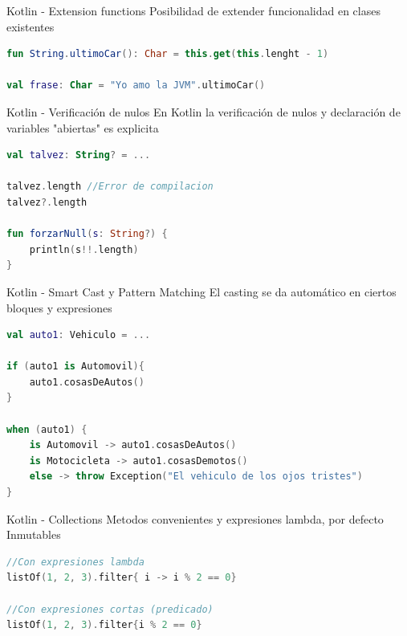 \documentclass[aspectratio=169]{beamer}
\begin{document}
\begin{frame}[fragile]{Kotlin - Extension functions}
Posibilidad de extender funcionalidad en clases existentes
\begin{lstlisting}[language=Kotlin]
fun String.ultimoCar(): Char = this.get(this.lenght - 1)

val frase: Char = "Yo amo la JVM".ultimoCar()
\end{lstlisting}

\end{frame}


\begin{frame}[fragile]{Kotlin - Verificación de nulos}
En Kotlin la verificación de nulos y declaración de variables "abiertas" es explicita
\begin{lstlisting}[language=Kotlin]
val talvez: String? = ...

talvez.length //Error de compilacion
talvez?.length

fun forzarNull(s: String?) {
    println(s!!.length)
}

\end{lstlisting}

\end{frame}

\begin{frame}[fragile]{Kotlin - Smart Cast y Pattern Matching}
El casting se da automático en ciertos bloques y expresiones
\begin{lstlisting}[language=Kotlin]
val auto1: Vehiculo = ...

if (auto1 is Automovil){
    auto1.cosasDeAutos()
}

when (auto1) {
    is Automovil -> auto1.cosasDeAutos()
    is Motocicleta -> auto1.cosasDemotos()
    else -> throw Exception("El vehiculo de los ojos tristes")
}

\end{lstlisting}

\end{frame}


\begin{frame}[fragile]{Kotlin - Collections}
Metodos convenientes y expresiones lambda, por defecto Inmutables
\begin{lstlisting}[language=Kotlin]
//Con expresiones lambda
listOf(1, 2, 3).filter{ i -> i % 2 == 0}

//Con expresiones cortas (predicado)
listOf(1, 2, 3).filter{i % 2 == 0}
\end{lstlisting}
\end{frame}
\end{document}
